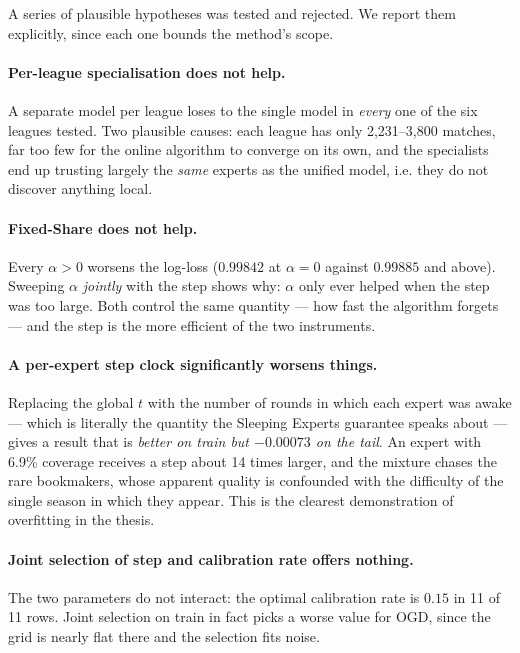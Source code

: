 \documentclass[12pt,a4paper,oneside]{report}
\renewcommand{\_}{\oldunderscore\allowbreak}
\theoremstyle{definition}
\theoremstyle{plain}
\theoremstyle{remark}
\begin{document}
A series of plausible hypotheses was tested and rejected. We report them explicitly, since each
one bounds the method's scope.

\paragraph{Per-league specialisation does not help.} A separate model per league loses to the
single model in \emph{every} one of the six leagues tested. Two plausible causes: each league has
only 2,231--3,800 matches, far too few for the online algorithm to converge on its own, and the
specialists end up trusting largely the \emph{same} experts as the unified model, i.e. they do not
discover anything local.

\paragraph{Fixed-Share does not help.} Every $\alpha > 0$ worsens the log-loss ($0.99842$ at
$\alpha=0$ against $0.99885$ and above). Sweeping $\alpha$ \emph{jointly} with the step shows why:
$\alpha$ only ever helped when the step was too large. Both control the same quantity --- how fast
the algorithm forgets --- and the step is the more efficient of the two instruments.

\paragraph{A per-expert step clock significantly worsens things.} Replacing the global $t$ with
the number of rounds in which each expert was awake --- which is literally the quantity the
Sleeping Experts guarantee speaks about --- gives a result that is \emph{better on train but
$-0.00073$ on the tail}. An expert with 6.9\% coverage receives a step about 14 times larger, and
the mixture chases the rare bookmakers, whose apparent quality is confounded with the difficulty
of the single season in which they appear. This is the clearest demonstration of overfitting in
the thesis.

\paragraph{Joint selection of step and calibration rate offers nothing.} The two parameters do not
interact: the optimal calibration rate is $0.15$ in 11 of 11 rows. Joint selection on train in fact
picks a worse value for OGD, since the grid is nearly flat there and the selection fits noise.
\end{document}

